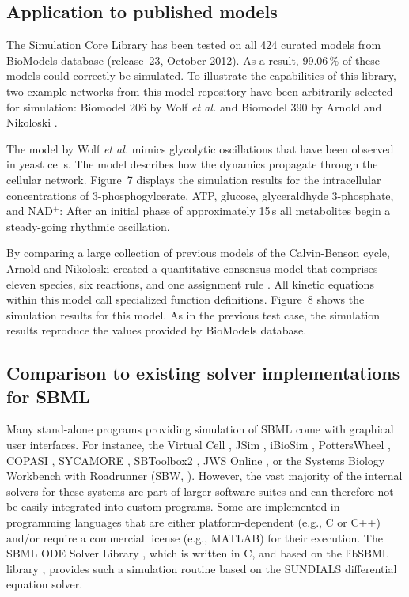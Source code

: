 \documentclass[10pt]{bmc_article}
\newenvironment{bmcformat}{\baselineskip20pt\sloppy\setboolean{publ}{false}}{\baselineskip20pt\sloppy}
\begin{document}
\begin{bmcformat}
\subsection*{Application to published models}

The Simulation Core Library has been tested on all 424 curated models from BioModels database \cite{Novere2006a} (release~23, October 2012).
As a result, 99.06\,\% of these models could correctly be simulated.
To illustrate the capabilities of this library, two example networks from this model repository have been arbitrarily selected for simulation:
Biomodel 206 by Wolf \emph{et al.} \cite{Wolf2000} and Biomodel 390 by Arnold and Nikoloski \cite{Arnold2011}.

The model by Wolf \emph{et al.} \cite{Wolf2000} mimics glycolytic oscillations that have been observed in yeast cells.
The model describes how the dynamics propagate through the cellular network. Figure~7 displays the simulation results
for the intracellular concentrations of 3-phosphogylcerate, ATP, glucose, glyceraldhyde 3-phosphate, and NAD$^+$:
After an initial phase of approximately 15\,s all metabolites begin a steady-going rhythmic oscillation. 

By comparing a large collection of previous models of the Calvin-Benson
cycle, Arnold and Nikoloski created a quantitative consensus model that
comprises eleven species, six reactions, and one assignment rule \cite{Arnold2011}.
All kinetic equations within this model call specialized function definitions.
Figure~8 shows the simulation results for this model.
As in the previous test case, the simulation results reproduce the values provided by BioModels database.  

\subsection*{Comparison to existing solver implementations for SBML}

Many stand-alone programs providing simulation of SBML come with graphical user interfaces.
For instance, the Virtual Cell \cite{Loew2001}, JSim \cite{Beard2012a}, iBioSim \cite{Myers2009},
PottersWheel \cite{Maiwald2008}, COPASI \cite{Hoops2006}, SYCAMORE \cite{Weidemann2008}, SBToolbox2
\cite{SBT_Schmidt2006}, JWS Online \cite{Olivier2004}, or the Systems Biology Workbench with Roadrunner (SBW, \cite{Bergmann06}). 
However, the vast majority of the internal solvers for these systems are part of
larger software suites and can therefore not be easily integrated into custom
programs. Some are implemented in programming languages that are either
platform-dependent (e.g., C or C++) and/or require a commercial license (e.g.,
MATLAB\texttrademark{}) for their execution.
The SBML ODE Solver Library \cite{Machne2006}, which is written in C,
and based on the libSBML library \cite{Bornstein2008}, 
provides such a simulation routine based on the SUNDIALS differential equation
solver.


\end{bmcformat}
\end{document}

